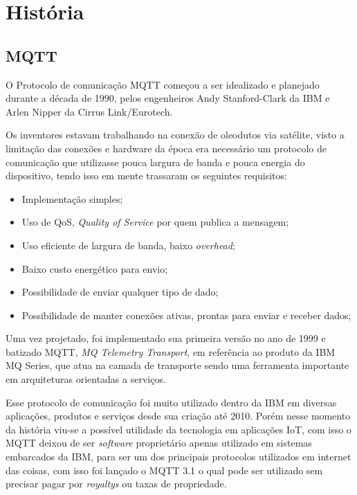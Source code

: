 \documentclass[12pt, a4paper]{article}
\begin{document}
\section{História}
\subsection{MQTT}\label{MQTT}
O Protocolo de comunicação MQTT começou a ser idealizado e planejado durante a década de 1990\cite{historia_breve_resumo_mqtt}, pelos engenheiros Andy Stanford-Clark da IBM e Arlen Nipper da Cirrus Link/Eurotech\cite{historia_introduction_mqtt}.

Os inventores estavam trabalhando na conexão de oleodutos via satélite, visto a limitação das conexões e hardware da época era necessário um protocolo de comunicação que utilizasse pouca largura de banda e pouca energia do dispositivo, tendo isso em mente trassaram os seguintes requisitos\cite{historia_introduction_mqtt}:
\begin{itemize}
    \item Implementação simples;
    \item Uso de QoS, \textit{Quality of Service} por quem publica a mensagem;
    \item Uso eficiente de largura de banda, baixo \textit{overhead};
    \item Baixo custo energético para envio;
    \item Possibilidade de enviar qualquer tipo de dado;
    \item Possibilidade de manter conexões ativas, prontas para enviar e receber dados;
\end{itemize}

Uma vez projetado, foi implementado sua primeira versão no ano de 1999 e batizado MQTT, \textit{MQ Telemetry Transport}, em referência ao produto da IBM MQ Series, que atua na camada de transporte sendo uma ferramenta importante em arquiteturas orientadas a serviços\cite{historia_ibm_mq}.

Esse protocolo de comunicação foi muito utilizado dentro da IBM em diversas aplicações, produtos e serviços desde sua criação até 2010\cite{historia_introduction_mqtt}. Porém nesse momento da história viu-se a possível utilidade da tecnologia em aplicações IoT, com isso o MQTT deixou de ser \textit{software} proprietário apenas utilizado em sistemas embarcados da IBM, para ser um dos principais protocolos utilizados em internet das coisas, com isso foi lançado o MQTT 3.1 o qual pode ser utilizado sem precisar pagar por \textit{royaltys} ou taxas de propriedade.
\end{document}
